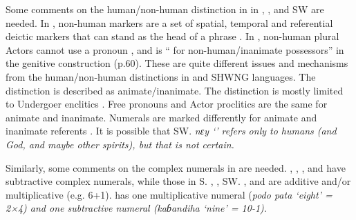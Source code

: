 Some comments on the human/non-human distinction in 
in , ,  and SW  are needed.
In , non-human markers are a set of spatial,
temporal and referential deictic markers that can stand as the
head of a phrase \citep[39f, 83f]{TaberTaber2015}.
In , non-human plural Actors cannot use a pronoun \citep[35]{Coward2005},
and is “{\0} for non-human/inanimate possessors” in the genitive construction (p.60).
These are quite different issues
and mechanisms from the human/non-human distinctions in  and SHWNG languages.
The  distinction is described as animate/inanimate.
The distinction is mostly limited to  Undergoer enclitics \citep[140]{Hughes2000}.
Free pronouns and Actor proclitics are the same for animate and inanimate.
Numerals are marked differently for animate and inanimate referents \citep[155--157]{Hughes2000}.
It is possible that SW.  \it{nɛy} ‘’ refers only
to humans (and God, and maybe other spirits),
but that is not certain.

Similarly, some comments on the complex numerals in  are needed.
, , , and  have subtractive complex numerals,
while those in S. , , SW.
, and  are additive and/or multiplicative (e.g. 6+1).
 has one multiplicative numeral (\it{podo pata} ‘eight’
= 2×4) and one subtractive numeral (\it{kaɓandiha} ‘nine’ = 10-1).

